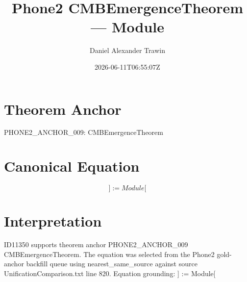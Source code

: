 \documentclass[11pt]{article}
\title{Phone2 CMBEmergenceTheorem — Module}
\author{Daniel Alexander Trawin}
\date{2026-06-11T06:55:07Z}
\begin{document}
\maketitle
\section*{Theorem Anchor}
PHONE2_ANCHOR_009: CMBEmergenceTheorem
\section*{Canonical Equation}
\[
] := Module[
\]
\section*{Interpretation}
ID11350 supports theorem anchor PHONE2_ANCHOR_009 CMBEmergenceTheorem. The equation was selected from the Phone2 gold-anchor backfill queue using nearest_same_source against source UnificationComparison.txt line 820. Equation grounding: ] := Module[
\end{document}
